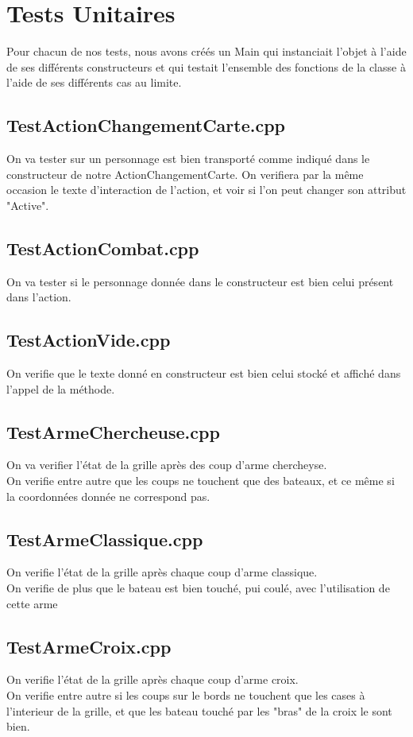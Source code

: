 \chapter{Tests Unitaires}
    Pour chacun de nos tests, nous avons créés un Main qui instanciait l'objet à l'aide de ses différents constructeurs et qui testait l'ensemble des fonctions de la classe à l'aide de ses différents cas au limite.
    \section{TestActionChangementCarte.cpp}
        On va tester sur un personnage est bien transporté comme indiqué dans le constructeur de notre ActionChangementCarte. On verifiera par la même occasion le texte d'interaction de l'action, et voir si l'on peut changer son attribut "Active".
    \section{TestActionCombat.cpp}
        On va tester si le personnage donnée dans le constructeur est bien celui présent dans l'action.
    \section{TestActionVide.cpp}
        On verifie que le texte donné en constructeur est bien celui stocké et affiché dans l'appel de la méthode.
    \section{TestArmeChercheuse.cpp}
        On va verifier l'état de la grille après des coup d'arme chercheyse.\\
        On verifie entre autre que les coups ne touchent que des bateaux, et ce même si la coordonnées donnée ne correspond pas.
    \section{TestArmeClassique.cpp}
        On verifie l'état de la grille après chaque coup d'arme classique.\\
        On verifie de plus que le bateau est bien touché, pui coulé, avec l'utilisation de cette arme
    \section{TestArmeCroix.cpp}
        On verifie l'état de la grille après chaque coup d'arme croix.\\
        On verifie entre autre si les coups sur le bords ne touchent que les cases à l'interieur de la grille, et que les bateau touché par les "bras" de la croix le sont bien.
